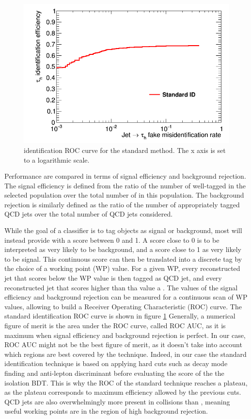 \begin{figure}
    \centering
    \includegraphics[width=\textwidth]{Images/std_ROC.png}
    \caption{\tauh identification ROC curve for the standard method. The x axis is set to a logarithmic scale.}
    \label{fig:std_ROC}
\end{figure}

Performance are compared in terms of signal efficiency and background rejection. The signal efficiency is defined from the ratio of the number of well-tagged \tauh in the selected population over the total number of \tauh in this population. The background rejection is similarly defined as the ratio of the number of appropriately tagged QCD jets over the total number of QCD jets considered.

While the goal of a classifier is to tag objects as signal or background, most will instead provide with a score between 0 and 1. A score close to 0 is to be interpreted as very likely to be background, and a score close to 1 as very likely to be signal. This continuous score can then be translated into a discrete tag by the choice of a working point (WP) value. For a given WP, every reconstructed jet that scores below the WP value is then tagged as QCD jet, and every reconstructed jet that scores higher than tha value a \tauh. The values of the signal efficiency and background rejection can be measured for a continuous scan of WP values, allowing to build a Receiver Operating Characteristic (ROC) curve. The standard identification ROC curve is shown in figure \ref{fig:std_ROC}
Generally, a numerical figure of merit is the area under the ROC curve, called ROC AUC, as it is maximum when signal efficiency and background rejection is perfect.
In our case, ROC AUC might not be the best figure of merit, as it doesn't take into account which regions are best covered by the technique. Indeed, in our case the standard identification technique is based on applying hard cuts such as decay mode finding and anti-lepton discriminant before evaluating the score of the the isolation BDT. This is why the ROC of the standard technique reaches a plateau, as the plateau corresponds to maximum efficiency allowed by the previous cuts.
QCD jets are also overwhelmingly more present in collisions than \tauh, meaning useful working points are in the region of high background rejection. 

